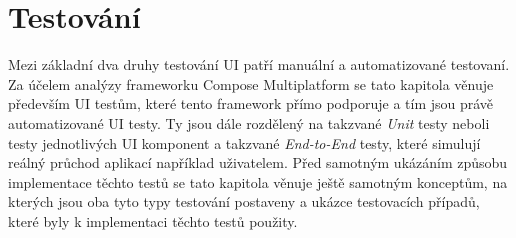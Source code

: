 \chapter{Testování} \label{testsSection}


Mezi základní dva druhy testování UI patří manuální a automatizované testovaní. Za účelem analýzy frameworku Compose Multiplatform
se tato kapitola věnuje především UI testům, které tento framework přímo podporuje a tím jsou právě automatizované UI testy.
Ty jsou dále rozdělený na takzvané \textit{Unit} testy neboli testy jednotlivých UI komponent a takzvané \textit{End-to-End} testy, 
které simulují reálný průchod aplikací například uživatelem. Před samotným ukázáním způsobu implementace těchto testů se tato kapitola
věnuje ještě samotným konceptům, na kterých jsou oba tyto typy testování postaveny a ukázce testovacích případů, které byly k implementaci
těchto testů použity.







